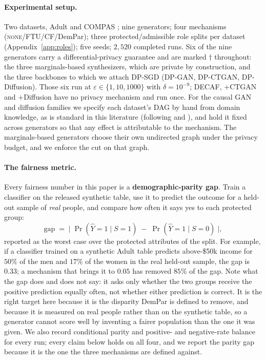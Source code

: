 \documentclass{article}
\begin{document}
\paragraph{Experimental setup.}
Two datasets, Adult \citep{becker1996adult} and COMPAS
\citep{angwin2016machinebias}; nine generators; four mechanisms
(\textsc{none}/FTU/CF/DemPar); three protected/admissible role splits per
dataset (Appendix~\ref{app:roles}); five seeds; $2{,}520$ completed runs. Six of
the nine generators carry a differential-privacy guarantee
\citep{dwork2006calibrating} and are marked $\dagger$ throughout: the three
marginals-based synthesizers, which are private by construction, and the three
backbones to which we attach DP-SGD (DP-GAN, DP-CTGAN, DP-Diffusion). Those
six run at $\varepsilon \in \{1,10,1000\}$ with $\delta = 10^{-9}$; DECAF,
$+$CTGAN and $+$Diffusion have no privacy mechanism and run once. For the
causal GAN and diffusion families we specify each dataset's DAG by hand from
domain knowledge, as is standard in this literature (following
\citet{kusner2017counterfactual} and \citet{zhang2017causalframework}), and
hold it fixed across generators so that any effect is attributable to the
mechanism. The marginals-based generators choose their own undirected graph
under the privacy budget, and we enforce the cut on that graph.

\paragraph{The fairness metric.}
Every fairness number in this paper is a \textbf{demographic-parity gap}.
Train a classifier on the released synthetic table, use it to predict the
outcome for a held-out sample of \emph{real} people, and compare how often it
says yes to each protected group:
\[
  \mathrm{gap} \;=\; \bigl|\;\Pr(\hat{Y}{=}1 \mid S{=}1)\;-\;\Pr(\hat{Y}{=}1 \mid S{=}0)\;\bigr| ,
\]
reported as the worst case over the protected attributes of the split. For
example, if a classifier trained on a synthetic Adult table predicts
above-\$50k income for $50\%$ of the men and $17\%$ of the women in the real
held-out sample, the gap is $0.33$; a mechanism that brings it to $0.05$ has
removed $85\%$ of the gap. Note what the gap does and does not say: it asks
only whether the two groups receive the positive prediction equally often, not
whether either prediction is correct. It is the right target here because it
is the disparity DemPar is defined to remove, and because it is measured on
real people rather than on the synthetic table, so a generator cannot score
well by inventing a fairer population than the one it was given. We also
record conditional parity and positive- and negative-rate balance for every
run; every claim below holds on all four, and we report the parity gap because
it is the one the three mechanisms are defined against.
\end{document}
